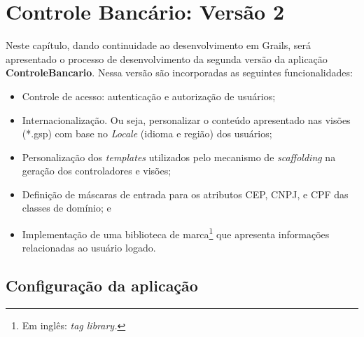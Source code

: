 \chapter{Controle Bancário: Versão 2}\label{autenticacao}

Neste  capítulo,   dando  continuidade   ao  desenvolvimento  em   Grails,  será
apresentado o  processo de desenvolvimento  da segunda versão da  aplicação {\bf
  ControleBancario}. Nessa versão são incorporadas as seguintes funcionalidades:

\begin{itemize}

\vspace{0.5cm}

\item Controle de acesso: autenticação e autorização de usuários;

\vspace{0.5cm}

\item  Internacionalização. Ou  seja,  personalizar o  conteúdo apresentado  nas
  visões (*.gsp) com base no {\it Locale} (idioma e região) dos usuários;

\vspace{0.5cm}

\item  Personalização dos  {\it  templates} utilizados  pelo  mecanismo de  {\it
  scaffolding} na geração dos controladores e visões;

\vspace{0.5cm}

\item Definição  de máscaras de entrada para  os atributos CEP, CNPJ,  e CPF das
  classes de domínio; e 

\vspace{0.5cm}

\item  Implementação de  uma biblioteca  de marca\footnote{Em  inglês:  {\it tag
    library.}} que apresenta informações relacionadas ao usuário logado. 

\end{itemize}

\section{Configuração da aplicação} 

\vspace{0.5cm}



